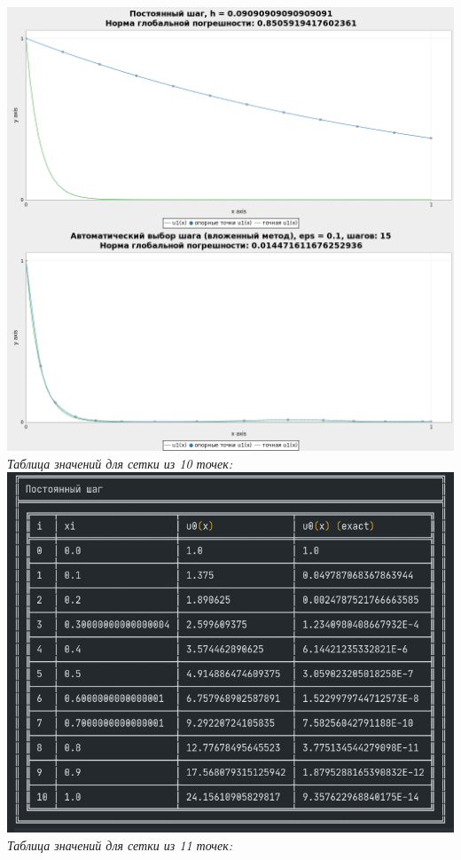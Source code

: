 \documentclass[a4paper,12pt]{article}
\begin{document}
\begin{flushleft}
\begin{enumerate}
      \includegraphics[scale=0.325]{11_segments.png}\linebreak
      \textit{Таблица значений для сетки из 10 точек:}\linebreak\linebreak
      \includegraphics[scale=0.325]{10steps.png}\linebreak
      \textit{Таблица значений для сетки из 11 точек:}\linebreak\linebreak

\end{enumerate}
\end{flushleft}
\end{document}
